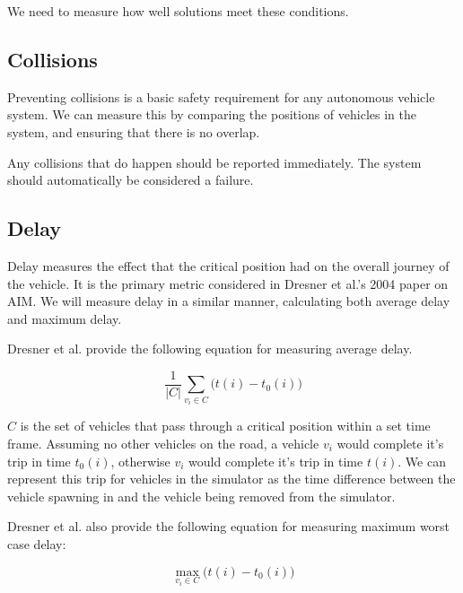 We need to measure how well solutions meet these conditions. 

\subsection{Collisions}
\label{subsec:Collisions}
Preventing collisions is a basic safety requirement for any autonomous vehicle system. We can measure this by comparing the positions of vehicles in the system, and ensuring that there is no overlap.


Any collisions that do happen should be reported immediately. The system should automatically be considered a failure.

\subsection{Delay}
\label{subsec:Delay}
Delay measures the effect that the critical position had on the overall journey of the vehicle. It is the primary metric considered in Dresner et al.'s 2004 paper \citep{Dresner2004} on AIM. We will measure delay in a similar manner, calculating both average delay and maximum delay.

Dresner et al. provide the following equation for measuring average delay.

\begin{equation}
\frac{1}{|C|}\sum_{v_i\in{C}}\bigl(t(i) - t_0(i)\bigr)
\end{equation}

$C$ is the set of vehicles that pass through a critical position within a set time frame. Assuming no other vehicles on the road, a vehicle $v_i$ would complete it's trip in time $t_0(i)$, otherwise $v_i$ would complete it's trip in time $t(i)$. We can represent this trip for vehicles in the simulator as the time difference between the vehicle spawning in and the vehicle being removed from the simulator.

Dresner et al. also provide the following equation for measuring maximum worst case delay:

\begin{equation}
\max_{v_i\in{C}}\bigl({t(i)} - t_0(i)\bigr)
\end{equation}

